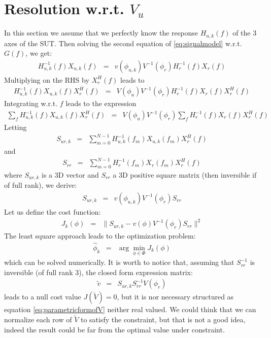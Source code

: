 \documentclass[a4paper, 12pt]{report}
\begin{document}
\section{Resolution w.r.t. $V_{u}$}
In this section we assume that we perfectly know the response $H_{u,k}(f)$ of the 3 axes of the SUT. Then solving the second equation of \eqref{eq:signalmodel} w.r.t. $G(f)$, we get:
\begin{eqnarray}
\label{eq:XuasXr}
H_{u,k}^{-1}(f)X_{u,k}(f)&=&v(\phi_{u,k})V ^{-1}(\phi_{r})H_{r}^{-1}(f)X_{r}(f)
\end{eqnarray}
Multiplying on the RHS by $X_{r}^{H}(f)$ leads to
\begin{eqnarray*}
H_{u,k}^{-1}(f)X_{u,k}(f)X_{r}^{H}(f)&=&V(\phi_{u})V ^{-1}(\phi_{r})H_{r}^{-1}(f)X_{r}(f)X_{r}^{H}(f)
\end{eqnarray*}
Integrating w.r.t. $f$ leads to the expression
\begin{eqnarray}
\label{eq:integrateonf}
\sum_{f} H_{u,k}^{-1}(f)X_{u,k}(f)X_{r}^{H}(f)&=&
V(\phi_{u})V^{-1}(\phi_{r})
\sum_{f} H_{r}^{-1}(f)X_{r}(f)X_{r}^{H}(f)
\end{eqnarray}
Letting
\begin{eqnarray*}
S_{ur,k}&=&\sum_{m=0}^{N-1} H_{u,k}^{-1}(f_{m})X_{u,k}(f_{m})X_{r}^{H}(f)
\end{eqnarray*}
and 
\begin{eqnarray*}
S_{rr}&=&\sum_{m=0}^{N-1} H_{r}^{-1}(f_{m})X_{r}(f_{m})X_{r}^{H}(f)
\end{eqnarray*}
where $S_{ur,k}$ is a 3D vector and $S_{rr}$ a $3$D positive square matrix (then inversible if of full rank), 
we derive:
\begin{eqnarray}
\label{eq:linearmodel}
S_{ur,k}&=&v(\phi_{u,k})V ^{-1}(\phi_{r})S_{rr}
\end{eqnarray}
Let us define the cost function:
\begin{eqnarray}
\label{eq:pbtosolve}
J_{k}(\phi) &=&  \|S_{ur,k} - v(\phi)V ^{-1}(\phi_{r})S_{rr}\|^{2}
\end{eqnarray}
The least square approach leads to the optimization problem:
\begin{eqnarray}
 \label{eq:hatphi}
\hat \phi_{k} &=& \arg\min_{\phi\in\Phi} J_{k}(\phi)
\end{eqnarray}
which can be solved numerically. It is worth to notice that, assuming that $S_{rr}^{-1}$ is inversible (of full rank 3), the closed form expression matrix:
\begin{eqnarray*}
\tilde v &=&S_{ur,k}S_{rr}^{-1}V(\phi_{r})
\end{eqnarray*}
leads to a null cost value $J(\tilde V)=0$, but it is nor necessary structured as equation \eqref{eq:parametricformofV} neither real valued.  We could think that we can normalize each row of $\tilde V$ to satisfy the constraint, but that is not a good idea, indeed the result could be far from the optimal value under constraint. 
\end{document}
